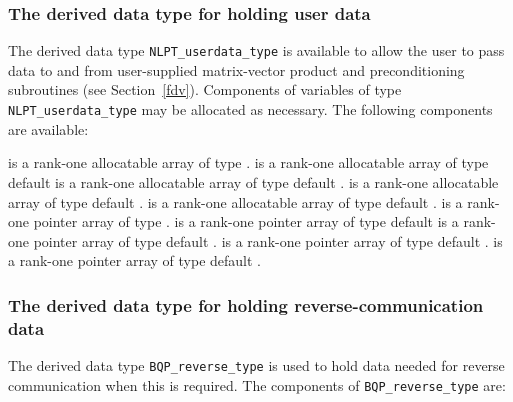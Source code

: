 \documentclass{galahad}
\newcommand{\packagename}{BQP}
\begin{document}

\subsubsection{The derived data type for holding user data}\label{typeuserdata}
The derived data type 
{\tt NLPT\_userdata\_type} 
is available to allow the user to pass data to and from user-supplied 
matrix-vector product and preconditioning 
subroutines (see Section~\ref{fdv}).
Components of variables of type {\tt NLPT\_userdata\-\_type} may be allocated as
necessary. The following components are available:

\begin{description}
 is a rank-one allocatable array of type \integer.
 is a rank-one allocatable array of type default  \realdp
{} is a rank-one allocatable array of type default \complexdp.
 is a rank-one allocatable array of type default \character.
 is a rank-one allocatable array of type default \logical.
 is a rank-one pointer array of type \integer.
 is a rank-one pointer array of type default  \realdp
{} is a rank-one pointer array of type default \complexdp.
 is a rank-one pointer array of type default \character.
 is a rank-one pointer array of type default \logical.
\end{description}


\subsubsection{The derived data type for holding reverse-communication data}\label{typereverse}
The derived data type 
{\tt \packagename\_reverse\_type} 
is used to hold data needed for reverse communication when this is
required.
The components of 
{\tt \packagename\_reverse\_type} 
are:
\end{document}
